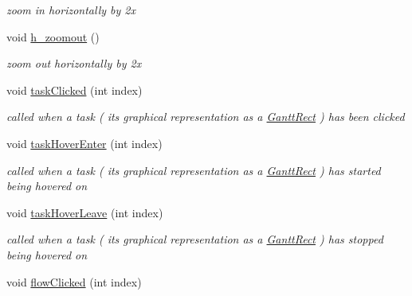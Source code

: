 \begin{DoxyCompactItemize}
\begin{DoxyCompactList}\small\item\em zoom in horizontally by 2x \end{DoxyCompactList}\item 
\hypertarget{class_main_window_a777aff65da0144d1ed34646518ea955a}{}void \hyperlink{class_main_window_a777aff65da0144d1ed34646518ea955a}{h\+\_\+zoomout} ()\label{class_main_window_a777aff65da0144d1ed34646518ea955a}

\begin{DoxyCompactList}\small\item\em zoom out horizontally by 2x \end{DoxyCompactList}\item 
\hypertarget{class_main_window_a0c980716d7ece94ad4e01921ce557e98}{}void \hyperlink{class_main_window_a0c980716d7ece94ad4e01921ce557e98}{task\+Clicked} (int index)\label{class_main_window_a0c980716d7ece94ad4e01921ce557e98}

\begin{DoxyCompactList}\small\item\em called when a task ( its graphical representation as a \hyperlink{class_gantt_rect}{Gantt\+Rect} ) has been clicked \end{DoxyCompactList}\item 
\hypertarget{class_main_window_a2d3ef18f661856ebd7f1ee149e95c900}{}void \hyperlink{class_main_window_a2d3ef18f661856ebd7f1ee149e95c900}{task\+Hover\+Enter} (int index)\label{class_main_window_a2d3ef18f661856ebd7f1ee149e95c900}

\begin{DoxyCompactList}\small\item\em called when a task ( its graphical representation as a \hyperlink{class_gantt_rect}{Gantt\+Rect} ) has started being hovered on \end{DoxyCompactList}\item 
\hypertarget{class_main_window_a3a3957874de63e80e41661860e2b12c3}{}void \hyperlink{class_main_window_a3a3957874de63e80e41661860e2b12c3}{task\+Hover\+Leave} (int index)\label{class_main_window_a3a3957874de63e80e41661860e2b12c3}

\begin{DoxyCompactList}\small\item\em called when a task ( its graphical representation as a \hyperlink{class_gantt_rect}{Gantt\+Rect} ) has stopped being hovered on \end{DoxyCompactList}\item 
\hypertarget{class_main_window_aec3a0dff06eb089dbf3d8c4175d8e004}{}void \hyperlink{class_main_window_aec3a0dff06eb089dbf3d8c4175d8e004}{flow\+Clicked} (int index)\label{class_main_window_aec3a0dff06eb089dbf3d8c4175d8e004}


\end{DoxyCompactItemize}
